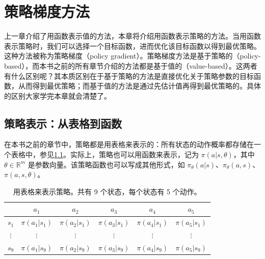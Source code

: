\chapter{策略梯度方法}
\label{ch:rl-pg}



上一章介绍了用函数表示值的方法，本章将介绍用函数表示策略的方法。当用函数表示策略时，我们可以选择一个目标函数，进而优化该目标函数以得到最优策略。这种方法被称为策略梯度（policy gradient）。策略梯度方法是基于策略的（policy-based），而本书之前的所有章节介绍的方法都是基于值的（value-based）。这两者有什么区别呢？其本质区别在于基于策略的方法是直接优化关于策略参数的目标函数，从而得到最优策略；而基于值的方法是通过先估计值再得到最优策略的。具体的区别大家学完本章就会清楚了。

\section{策略表示：从表格到函数}
\label{sec:rl-pg-representation}

在本书之前的章节中，策略都是用表格来表示的：所有状态的动作概率都存储在一个表格中，参见\cref{tab:rl-pg-tabular}。实际上，策略也可以用函数来表示，记为 $\pi(a|s,\theta)$，其中 $\theta \in \mathbb{R}^m$ 是参数向量。该策略函数也可以写成其他形式，如 $\pi_{\theta}(a|s)$、$\pi_{\theta}(a,s)$、$\pi(a,s,\theta)$。

\begin{table}[H]\centering
\caption{用表格来表示策略。共有 9 个状态，每个状态有 5 个动作。}
\label{tab:rl-pg-tabular}
\begin{tabular}{cccccc}
\toprule
 & $a_1$ & $a_2$ & $a_3$ & $a_4$ & $a_5$ \\
\midrule
$s_1$ & $\pi(a_1|s_1)$ & $\pi(a_2|s_1)$ & $\pi(a_3|s_1)$ & $\pi(a_4|s_1)$ & $\pi(a_5|s_1)$ \\
$\vdots$ & $\vdots$ & $\vdots$ & $\vdots$ & $\vdots$ & $\vdots$ \\
$s_9$ & $\pi(a_1|s_9)$ & $\pi(a_2|s_9)$ & $\pi(a_3|s_9)$ & $\pi(a_4|s_9)$ & $\pi(a_5|s_9)$ \\
\bottomrule
\end{tabular}
\end{table}

